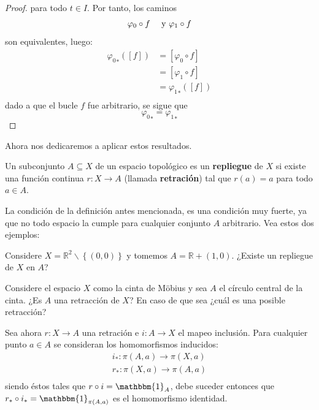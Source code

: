 \documentclass[12pt]{report}
\theoremstyle{largebreak}
\newcommand\cf[3]{\ensuremath{#1:#2\rightarrow#3}}
\newcommand{\bbm}[1]{\ensuremath{\mathbbm{#1}}}
\begin{document}
\begin{proof}
        para todo $t\in I$. Por tanto, los caminos
        \begin{equation*}
            \varphi_0\circ f\quad\textup{ y }\varphi_1\circ f
        \end{equation*}
        son equivalentes, luego:
        \begin{equation*}
            \begin{split}
                {\varphi_0}_*([f])&=[\varphi_0\circ f]\\
                &=[\varphi_1\circ f]\\
                &={\varphi_1}_*([f])\\
            \end{split}
        \end{equation*}
        dado a que el bucle $f$ fue arbitrario, se sigue que
        \begin{equation*}
            {\varphi_0}_*={\varphi_1}_*
        \end{equation*}
    \end{proof}

    Ahora nos dedicaremos a aplicar estos resultados.

    \begin{mydef}
        Un subconjunto $A\subseteq X$ de un espacio topológico es un \textbf{repliegue} de $X$ si existe una función continua $\cf{r}{X}{A}$ (llamada \textbf{retración}) tal que $r(a)=a$ para todo $a\in A$.
    \end{mydef}

    La condición de la definición antes mencionada, es una condición muy fuerte, ya que no todo espacio la cumple para cualquier conjunto $A$ arbitrario. Vea estos dos ejemplos:

    \begin{exa}
        Considere $X=\mathbb{R}^2\backslash\left\{(0,0)\right\}$ y tomemos $A=\mathbb{R}+(1,0)$. ¿Existe un repliegue de $X$ en $A$?
    \end{exa}

    \begin{exa}
        Considere el espacio $X$ como la cinta de Möbius y sea $A$ el círculo central de la cinta. ¿Es $A$ una retracción de $X$? En caso de que sea ¿cuál es una posible retracción?
    \end{exa}

    Sea ahora $\cf{r}{X}{A}$ una retración e $\cf{i}{A}{X}$ el mapeo inclusión. Para cualquier punto $a\in A$ se consideran los homomorfismos inducidos:
    \begin{equation*}
        \begin{split}
            \cf{i_*}{\pi(A,a)}{\pi(X,a)}\\
            \cf{r_*}{\pi(X,a)}{\pi(A,a)}\\
        \end{split}
    \end{equation*}
    siendo éstos tales que $r\circ i=\bbm{1}_{A}$, debe suceder entonces que $r_*\circ i_*=\bbm{1}_{\pi(A,a)}$ es el homomorfismo identidad.
    
\end{document}
